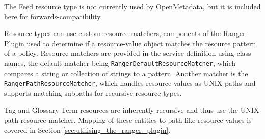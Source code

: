 
The Feed resource type is not currently used by OpenMetadata, but it is included here for forwards-compatibility.

Resource types can use custom resource matchers, components of the Ranger Plugin used to determine if a resource-value object matches the resource pattern of a policy. Resource matchers are provided in the service definition using class names, the default matcher being \texttt{RangerDefaultResourceMatcher}, which compares a string or collection of strings to a pattern. Another matcher is the \texttt{RangerPathResourceMatcher}, which handles resource values as UNIX paths and supports matching subpaths for recursive resource types.

Tag and Glossary Term resources are inherently recursive and thus use the UNIX path resource matcher. Mapping of these entities to path-like resource values is covered in Section \ref{sec:utilising_the_ranger_plugin}.

